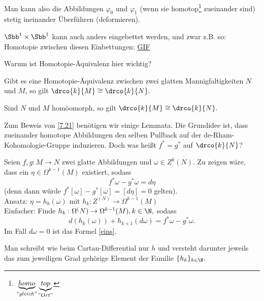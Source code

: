 \begin{rem*}
	Man kann also die Abbildungen \( \varphi_0 \) und \( \varphi_1 \) (wenn sie homotop\footnote{$\underbrace{homo}_{"gleich"}\underbrace{top}_{"Ort"}$} zueinander sind) stetig ineinander Überführen (deformieren).
\end{rem*}

\begin{exmp*}%
	
	\( \Sbb^1 \times \Sbb^1 \) kann auch anders eingebettet werden, und zwar z.B. so:
	Homotopie zwischen diesen Einbettungen:
	\href{https://en.wikipedia.org/wiki/Homotopy#/media/File:Mug_and_Torus_morph.gif}{GIF}
\end{exmp*}

\noindent Warum ist Homotopie-Äquivalenz hier wichtig?

\begin{thm}\label{7.21}
	Gibt es eine Homotopie-Äquivalenz zwischen zwei glatten Mannigfaltigkeiten $N$ und $M$, so gilt \( \drco{k}{M} \cong \drco{k}{N}. \)
\end{thm}

\begin{cor*}
	Sind $N$ und $M$ homöomorph, so gilt \( \drco{k}{M} \cong \drco{k}{N}. \)
\end{cor*}

Zum Beweis von \ref{7.21} benötigen wir einige Lemmata. Die Grundidee ist, dass zueinander homotope Abbildungen den selben Pullback auf der de-Rham-Kohomologie-Gruppe induzieren. Doch was heißt \( f^* = g^* \) auf \( \drco{k}{N} \)?

Seien $f,g: M \to N$ zwei glatte Abbildungen und $\omega \in Z^k(N)$. Zu zeigen wäre, dass ein $\eta \in \Omega^{k-1}(M)$ existiert, sodass
\begin{equation}\label{eins}
	f^*\omega - g^*\omega = d\eta
\end{equation}
(denn dann würde \( f^*[\omega] - g^*[\omega] = [d\eta] = 0 \) gelten).\\
Ansatz: \( \eta = h_k(\omega) \) mit \( h_k: Z^(N) \to \Omega^{k-1}(M) \)\\
Einfacher: Finde \( h_k: \Omega^(N) \to \Omega^{k-1}(M), k \in \N, \) sodass
\begin{equation}\label{zwei}
	d(h_k(\omega)) + h_{k+1}(d\omega) = f^*\omega - g^*\omega.
\end{equation}
Im Fall $d\omega = 0$ ist das Formel \ref{eins}.

\begin{notat*}
	Man schreibt wie beim Cartan-Differential nur $h$ und versteht darunter jeweils das zum jeweiligen Grad gehörige Element der Familie \( \{h_k\}_{k \in \N}. \)
\end{notat*}

